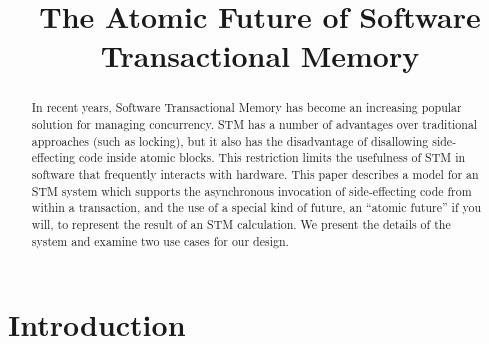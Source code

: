 \documentclass[conference]{IEEEtran}
\begin{document}
\title{The Atomic Future of Software Transactional Memory}

\author{
}

\maketitle


\begin{abstract}
In recent years, Software Transactional Memory has become an increasing popular solution for managing concurrency. STM has a number of advantages over traditional approaches (such as locking), but it also has the disadvantage of disallowing side-effecting code inside atomic blocks. This restriction limits the usefulness of STM in software that frequently interacts with hardware. This paper describes a model for an STM system which supports the asynchronous invocation of side-effecting code from within a transaction, and the use of a special kind of future, an ``atomic future'' if you will, to represent the result of an STM calculation. We present the details of the system and examine two use cases for our design.
\end{abstract}



\IEEEpeerreviewmaketitle


\section{Introduction}

\end{document}
